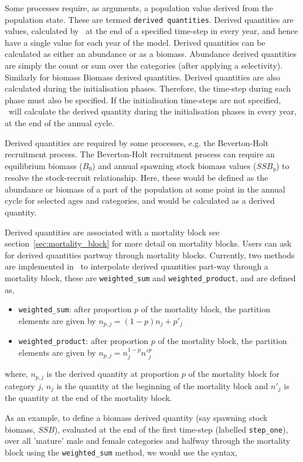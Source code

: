 Some processes require, as arguments, a population value derived from the population state. These are termed \texttt{derived quantities}. Derived quantities are values, calculated by \CNAME\ at the end of a specified time-step in every year, and hence have a single value for each year of the model. Derived quantities can be calculated as either an abundance or as a biomass. Abundance derived quantities are simply the count or sum over the categories (after applying a selectivity). Similarly for biomass Biomass derived quantities. Derived quantities are also calculated during the initialisation phases. Therefore, the time-step during each phase must also be specified. If the initialisation time-steps are not specified, \CNAME\ will calculate the derived quantity during the initialisation phases in every year, at the end of the annual cycle. 

Derived quantities are required by some processes, e.g. the Beverton-Holt recruitment process. The Beverton-Holt recruitment process can require an equilibrium biomass ($B_0$) and annual spawning stock biomass values ($SSB_y$) to resolve the stock-recruit relationship. Here, these would be defined as the abundance or biomass of a part of the population at some point in the annual cycle for selected ages and categories, and would be calculated as a derived quantity.

Derived quantities are associated with a mortality block see section~\ref{sec:mortality_block} for more detail on mortality blocks. Users can ask for derived quantities partway through mortality blocks. Currently, two methods are implemented in \CNAME\ to interpolate derived quantities part-way through a mortality block, these are \texttt{weighted\_sum} and \texttt{weighted\_product}, and are defined as,
\begin{itemize}
	\item \texttt{weighted\_sum}: after proportion $p$ of the mortality block, the partition elements are given by $n_{p,j} = (1 - p)n_j + p'_j$
	
	\item \texttt{weighted\_product}: after proportion $p$ of the mortality block, the partition elements are given by $n_{p,j} = n_j^{1-p} n'^p_j$
\end{itemize}
where, $n_{p,j}$ is the derived quantity at proportion $p$ of the mortality block for category $j$, $n_j$ is the quantity at the beginning of the mortality block and $n'_j$ is the quantity at the end of the mortality block.

As an example, to define a biomass derived quantity (say spawning stock biomass, $SSB$), evaluated at the end of the first time-step (labelled \texttt{step\_one}), over all 'mature' male and female categories and halfway through the mortality block using the \texttt{weighted\_sum} method, we would use the syntax,

